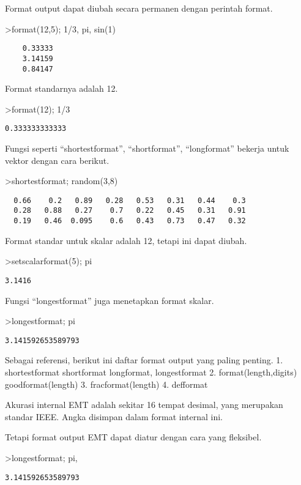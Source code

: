 \documentclass[
]{book}
\begin{document}
Format output dapat diubah secara permanen dengan perintah format.

\textgreater format(12,5); 1/3, pi, sin(1)

\begin{verbatim}
    0.33333 
    3.14159 
    0.84147 
\end{verbatim}

Format standarnya adalah 12.

\textgreater format(12); 1/3

\begin{verbatim}
0.333333333333
\end{verbatim}

Fungsi seperti ``shortestformat'', ``shortformat'', ``longformat'' bekerja untuk vektor dengan cara berikut.

\textgreater shortestformat; random(3,8)

\begin{verbatim}
  0.66    0.2   0.89   0.28   0.53   0.31   0.44    0.3 
  0.28   0.88   0.27    0.7   0.22   0.45   0.31   0.91 
  0.19   0.46  0.095    0.6   0.43   0.73   0.47   0.32 
\end{verbatim}

Format standar untuk skalar adalah 12, tetapi ini dapat diubah.

\textgreater setscalarformat(5); pi

\begin{verbatim}
3.1416
\end{verbatim}

Fungsi ``longestformat'' juga menetapkan format skalar.

\textgreater longestformat; pi

\begin{verbatim}
3.141592653589793
\end{verbatim}

Sebagai referensi, berikut ini daftar format output yang paling penting. 1. shortestformat shortformat longformat, longestformat 2. format(length,digits) goodformat(length) 3. fracformat(length) 4. defformat

Akurasi internal EMT adalah sekitar 16 tempat desimal, yang merupakan standar IEEE. Angka disimpan dalam format internal ini.

Tetapi format output EMT dapat diatur dengan cara yang fleksibel.

\textgreater longestformat; pi,

\begin{verbatim}
3.141592653589793
\end{verbatim}
\end{document}
